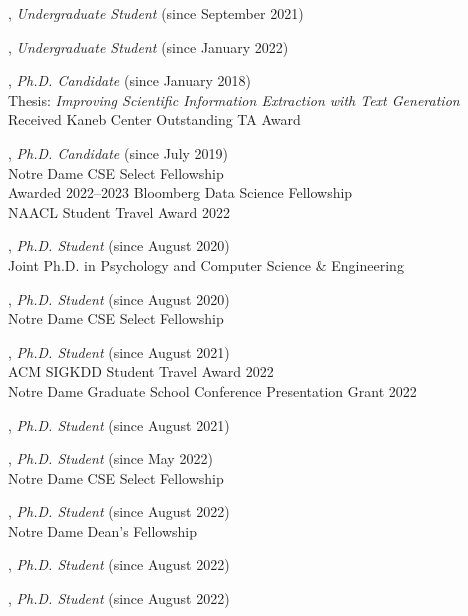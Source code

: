 \documentclass[10pt]{article}
\newenvironment{myindentpar}[1]%
{\begin{list}{}%
         {\setlength{\leftmargin}{#1}}%
         \item[]%
}
{\end{list}}
\newcounter{list}
\begin{document}
\begin{myindentpar}{0.75cm}

\hspace{-0.75cm}{\bf Yunxiang (Ryan) Yan}, \textit{Undergraduate Student} (since September 2021)

\hspace{-0.75cm}{\bf Weike Fang}, \textit{Undergraduate Student} (since January 2022)

\hspace{-0.75cm}{\bf Qingkai Zeng}, \textit{Ph.D. Candidate} (since January 2018) \\
	{Thesis: \textit{Improving Scientific Information Extraction with Text Generation}} \\
	{Received Kaneb Center Outstanding TA Award}

\hspace{-0.75cm}{\bf Wenhao Yu}, \textit{Ph.D. Candidate} (since July 2019) \\
	{Notre Dame CSE Select Fellowship} \\
	{Awarded 2022--2023 Bloomberg Data Science Fellowship} \\
	{NAACL Student Travel Award 2022}

\hspace{-0.75cm}{\bf Ms. Lingbo Tong}, \textit{Ph.D. Student} (since August 2020) \\
	{Joint Ph.D. in Psychology and Computer Science \& Engineering}

\hspace{-0.75cm}{\bf Ms. Mengxia Yu}, \textit{Ph.D. Student} (since August 2020) \\
	{Notre Dame CSE Select Fellowship}

\hspace{-0.75cm}{\bf Gang Liu}, \textit{Ph.D. Student} (since August 2021) \\
	{ACM SIGKDD Student Travel Award 2022} \\
	{Notre Dame Graduate School Conference Presentation Grant 2022}

\hspace{-0.75cm}{\bf Zhihan Zhang}, \textit{Ph.D. Student} (since August 2021)

\hspace{-0.75cm}{\bf Noah Ziems}, \textit{Ph.D. Student} (since May 2022) \\
	{Notre Dame CSE Select Fellowship}

\hspace{-0.75cm}{\bf Eric Inae}, \textit{Ph.D. Student} (since August 2022) \\
	{Notre Dame Dean's Fellowship}

\hspace{-0.75cm}{\bf Hy Dang}, \textit{Ph.D. Student} (since August 2022)

\hspace{-0.75cm}{\bf Ms. Nandini Banerjee}, \textit{Ph.D. Student} (since August 2022)

\end{myindentpar}
\end{document}
